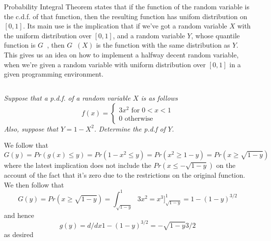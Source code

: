 \documentclass[11pt,oneside,titlepage]{book}
\DeclareMathOperator \inv {^{-1}}
\begin{document}
Probability Integral Theorem states that if the function of the random
variable is the c.d.f. of that function, then the resulting function
has unifom distribution on $[0, 1]$. Its main use is the implication
that if we've got a random variable $X$ with the uniform distribution
over $[0, 1]$, and a random variable $Y$, whose quantile function is
$G\inv$, then  $G\inv(X)$ is the function with the same distribution as
$Y$. This gives us an idea on how to implement a halfway decent random
variable, when we're given a random variable with uniform distribution
over $[0, 1]$ in a given programming environment.

\subsection{}

\textit{Suppose that a p.d.f. of a random variable $X$ is as follows}
$$
  f(x) = 
  \begin{cases}
    3x^2 \text{ for } 0 < x < 1 \\
    0 \text{ otherwise}
\end{cases}
$$
\textit{Also, suppose that $Y = 1 - X^2$. Determine the p.d.f of $Y$.}

We follow that
$$G(y) = Pr(g(x) \leq  y) = Pr(1 - x^2 \leq y) = Pr(x^2 \geq 1 - y) = Pr(x \geq \sqrt{1 - y})$$
where the latest implication does not include the $Pr(x \leq -\sqrt{1
- y})$ on the account of the fact that it's zero due to the
restrictions on the original function.
We then follow that
$$G(y) = Pr(x \geq \sqrt{1 - y}) = \int_{\sqrt{1 - y}}^{1}{3x^2} = x^3]^{1}_{\sqrt{1 - y}} = 1 - (1 - y)^{3/2}$$
and hence
$$g(y) = d/dx 1 - (1 - y)^{3/2} = -\sqrt{1 - y}3/2$$
as desired
\end{document}
